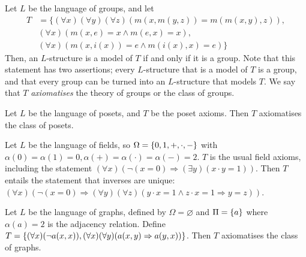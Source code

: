 \begin{example}
    Let \( L \) be the language of groups, and let
    \begin{align*}
        T &= \{(\forall x)(\forall y)(\forall z)(m(x,m(y,z)) = m(m(x,y), z)), \\
        &(\forall x)(m(x,e) = x \wedge m(e,x) = x), \\
        &(\forall x)(m(x,i(x)) = e \wedge m(i(x),x) = e)\}
    \end{align*}
    Then, an \( L \)-structure is a model of \( T \) if and only if it is a group.
    Note that this statement has two assertions; every \( L \)-structure that is a model of \( T \) is a group, and that every group can be turned into an \( L \)-structure that models \( T \).
    We say that \( T \) \emph{axiomatises} the theory of groups or the class of groups.
\end{example}
\begin{example}
    Let \( L \) be the language of posets, and \( T \) be the poset axioms.
    Then \( T \) axiomatises the class of posets.
\end{example}
\begin{example}
    Let \( L \) be the language of fields, so \( \Omega = \qty{0, 1, +, \cdot, -} \) with \( \alpha(0) = \alpha(1) = 0, \alpha(+) = \alpha(\cdot) = \alpha(-) = 2 \).
    \( T \) is the usual field axioms, including the statement \( (\forall x)(\neg (x = 0) \Rightarrow (\exists y)(x \cdot y = 1)) \).
    Then \( T \) entails the statement that inverses are unique: \( (\forall x)(\neg (x = 0) \Rightarrow (\forall y)(\forall z) (y \cdot x = 1 \wedge z \cdot x = 1 \Rightarrow y = z)) \).
\end{example}
\begin{example}
    Let \( L \) be the language of graphs, defined by \( \Omega = \varnothing \) and \( \Pi = \qty{a} \) where \( \alpha(a) = 2 \) is the adjacency relation.
    Define \( T = \qty{(\forall x)(\neg a(x,x)), (\forall x)(\forall y)(a(x,y) \Rightarrow a(y,x))} \).
    Then \( T \) axiomatises the class of graphs.
\end{example}


